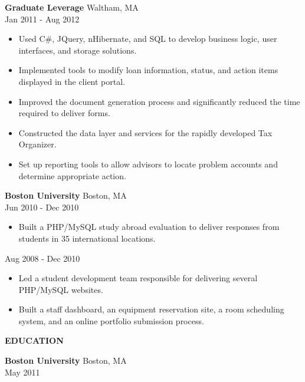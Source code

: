 \documentclass[10pt]{article}
\newcommand{\verticalspace}{\vspace{1.5mm}}
\newcommand{\heading}{\noindent\Large\bf} %
\newcommand{\headingspace}{\vspace{3.5mm}}
\begin{document}
{\bf Graduate Leverage} \hfill Waltham, MA \\
 \hfill Jan 2011 - Aug 2012
\begin{itemize}
\item Used C\#, JQuery, nHibernate, and SQL to develop business logic, user interfaces, and storage solutions.
\item Implemented tools to modify loan information, status, and action items displayed in the client portal.
\item Improved the document generation process and significantly reduced the time required to deliver forms.
\item Constructed the data layer and services for the rapidly developed Tax Organizer.
\item Set up reporting tools to allow advisors to locate problem accounts and determine appropriate action.
\end{itemize}

\verticalspace

{\bf Boston University} \hfill Boston, MA \\
 \hfill Jun 2010 - Dec 2010
\begin{itemize}
\item Built a PHP/MySQL study abroad evaluation to deliver responses from students in 35 international locations.
\end{itemize}

 \hfill Aug 2008 - Dec 2010
\begin{itemize}
\item Led a student development team responsible for delivering several PHP/MySQL websites. 
\item Built a staff dashboard, an equipment reservation site, a room scheduling system, and an online portfolio submission process.
\end{itemize}

\headingspace
{\heading EDUCATION}

\verticalspace

{\bf Boston University} \hfill Boston, MA \\
 \hfill May 2011
\end{document}
